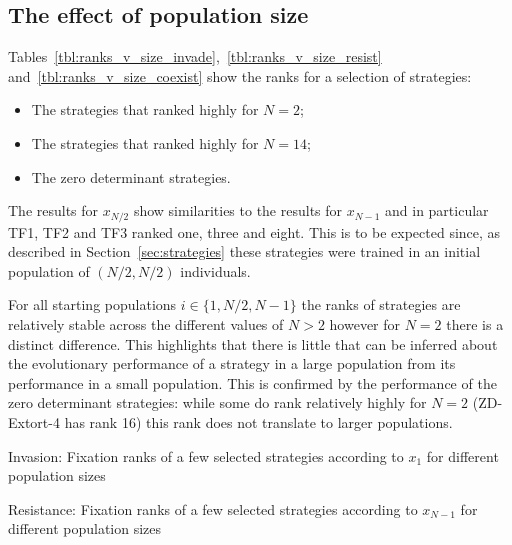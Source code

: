 \documentclass[10pt,journal]{IEEEtran}
\begin{document}
\subsection{The effect of population size}\label{sec:population_size}

Tables~\ref{tbl:ranks_v_size_invade},~\ref{tbl:ranks_v_size_resist}
and~\ref{tbl:ranks_v_size_coexist} show the ranks for a selection of
strategies:

\begin{itemize}
    \item The strategies that ranked highly for \(N=2\);
    \item The strategies that ranked highly for \(N=14\);
    \item The zero determinant strategies.
\end{itemize}

The results for \(x_{N/2}\) show similarities to the results for \(x_{N-1}\) and
in particular TF1, TF2 and TF3 ranked one, three and eight. This is to be
expected since, as described in Section~\ref{sec:strategies} these strategies
were trained in an initial population of \((N/2, N/2)\) individuals.

For all starting populations
\(i\in\{1, N/2, N-1\}\) the ranks of strategies are relatively stable across the
different values of \(N>2\) however for \(N=2\) there is a distinct difference.
This highlights that there is little that can be inferred about the evolutionary
performance of a strategy in a large population from its performance in a small
population. This is confirmed by the performance of the zero determinant strategies: while
some do rank relatively highly for \(N=2\) (ZD-Extort-4 has rank 16) this rank
does not translate to larger populations.

\begin{table}[!hbtp]
    \centering
    \scriptsize
    \scalebox{0.7}{}
    \caption{Invasion: Fixation ranks of a few selected strategies according to \(x_1\) for different
    population sizes}
    \label{tbl:ranks_v_size_invade}
\end{table}

\begin{table}[!hbtp]
    \centering
    \scriptsize
    \scalebox{0.7}{}
    \caption{Resistance: Fixation ranks of a few selected strategies according to \(x_{N-1}\) for different
    population sizes}
    \label{tbl:ranks_v_size_resist}
\end{table}
\end{document}
